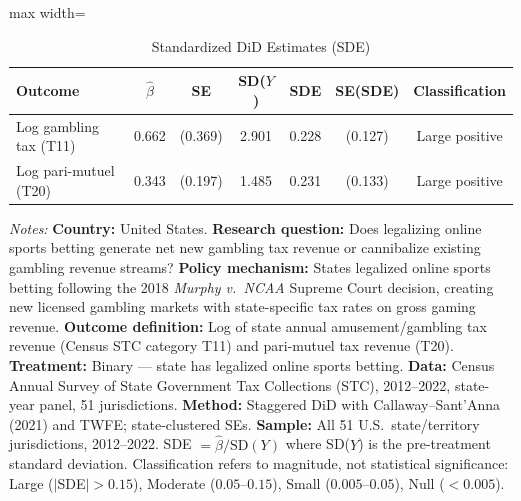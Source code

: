\begin{table}[htbp]
\centering
\caption{Standardized DiD Estimates (SDE)}
\label{tab:sde}
\begin{adjustbox}{max width=\textwidth}
\begin{tabular}{lcccccc}
\hline\hline
Outcome & $\hat{\beta}$ & SE & SD($Y$) & SDE & SE(SDE) & Classification \\
\hline
Log gambling tax (T11) & 0.662 & (0.369) & 2.901 & 0.228 & (0.127) & Large positive \\
Log pari-mutuel (T20) & 0.343 & (0.197) & 1.485 & 0.231 & (0.133) & Large positive \\
\hline\hline
\end{tabular}
\end{adjustbox}
\begin{minipage}{0.95\textwidth}
\vspace{0.3em}
\footnotesize \textit{Notes:} \textbf{Country:} United States. \textbf{Research question:} Does legalizing online sports betting generate net new gambling tax revenue or cannibalize existing gambling revenue streams? \textbf{Policy mechanism:} States legalized online sports betting following the 2018 \textit{Murphy v.\ NCAA} Supreme Court decision, creating new licensed gambling markets with state-specific tax rates on gross gaming revenue. \textbf{Outcome definition:} Log of state annual amusement/gambling tax revenue (Census STC category T11) and pari-mutuel tax revenue (T20). \textbf{Treatment:} Binary --- state has legalized online sports betting. \textbf{Data:} Census Annual Survey of State Government Tax Collections (STC), 2012--2022, state-year panel, 51 jurisdictions. \textbf{Method:} Staggered DiD with Callaway--Sant'Anna (2021) and TWFE; state-clustered SEs. \textbf{Sample:} All 51 U.S.\ state/territory jurisdictions, 2012--2022. SDE $= \hat{\beta} / \text{SD}(Y)$ where SD($Y$) is the pre-treatment standard deviation. Classification refers to magnitude, not statistical significance: Large ($|$SDE$| > 0.15$), Moderate ($0.05$--$0.15$), Small ($0.005$--$0.05$), Null ($< 0.005$).
\end{minipage}
\end{table}

